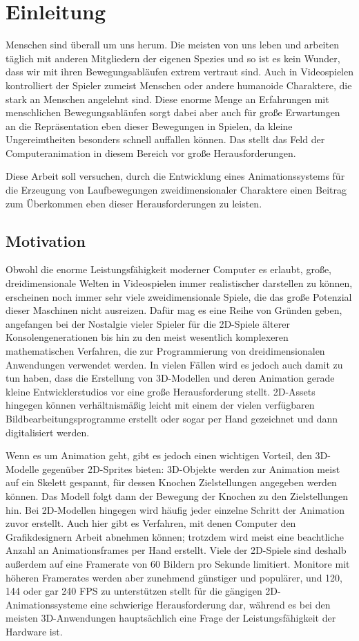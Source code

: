 \chapter{Einleitung}
Menschen sind überall um uns herum. Die meisten von uns leben und arbeiten täglich mit anderen Mitgliedern der eigenen Spezies und so ist es kein Wunder, dass wir mit ihren Bewegungsabläufen extrem vertraut sind. Auch in Videospielen kontrolliert der Spieler zumeist Menschen oder andere humanoide Charaktere, die stark an Menschen angelehnt sind. Diese enorme Menge an Erfahrungen mit menschlichen Bewegungsabläufen sorgt dabei aber auch für große Erwartungen an die Repräsentation eben dieser Bewegungen in Spielen, da kleine Ungereimtheiten besonders schnell auffallen können. Das stellt das Feld der Computeranimation in diesem Bereich vor große Herausforderungen.

Diese Arbeit soll versuchen, durch die Entwicklung eines Animationssystems für die Erzeugung von Laufbewegungen zweidimensionaler Charaktere einen Beitrag zum Überkommen eben dieser Herausforderungen zu leisten.

\section{Motivation}
Obwohl die enorme Leistungsfähigkeit moderner Computer es erlaubt, große, dreidimensionale Welten in Videospielen immer realistischer darstellen zu können, erscheinen noch immer sehr viele zweidimensionale Spiele, die das große Potenzial dieser Maschinen nicht ausreizen. Dafür mag es eine Reihe von Gründen geben, angefangen bei der Nostalgie vieler Spieler für die 2D-Spiele älterer Konsolengenerationen bis hin zu den meist wesentlich komplexeren mathematischen Verfahren, die zur Programmierung von dreidimensionalen Anwendungen verwendet werden. In vielen Fällen wird es jedoch auch damit zu tun haben, dass die Erstellung von 3D-Modellen und deren Animation gerade kleine Entwicklerstudios vor eine große Herausforderung stellt. 2D-Assets hingegen können verhältnismäßig leicht mit einem der vielen verfügbaren Bildbearbeitungsprogramme erstellt oder sogar per Hand gezeichnet und dann digitalisiert werden.

Wenn es um Animation geht, gibt es jedoch einen wichtigen Vorteil, den 3D-Modelle gegenüber 2D-Sprites bieten: 3D-Objekte werden zur Animation meist auf ein Skelett gespannt, für dessen Knochen Zielstellungen angegeben werden können. Das Modell folgt dann der Bewegung der Knochen zu den Zielstellungen hin. Bei 2D-Modellen hingegen wird häufig jeder einzelne Schritt der Animation zuvor erstellt. Auch hier gibt es Verfahren, mit denen Computer den Grafikdesignern Arbeit abnehmen können; trotzdem wird meist eine beachtliche Anzahl an Animationsframes per Hand erstellt. Viele der 2D-Spiele sind deshalb außerdem auf eine Framerate von 60 Bildern pro Sekunde limitiert. Monitore mit höheren Framerates werden aber zunehmend günstiger und populärer, und 120, 144 oder gar 240 FPS zu unterstützen stellt für die gängigen 2D-Animationssysteme eine schwierige Herausforderung dar, während es bei den meisten 3D-Anwendungen hauptsächlich eine Frage der Leistungsfähigkeit der Hardware ist.

